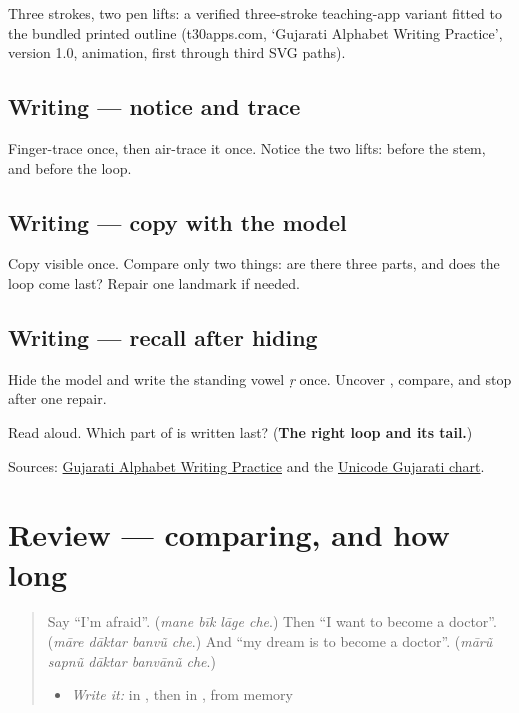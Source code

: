 Three strokes, two pen lifts: a verified three-stroke teaching-app variant fitted to the bundled printed outline (t30apps.com, ‘Gujarati Alphabet Writing Practice’, version 1.0,  animation, first through third SVG paths).

\subsection*{Writing — notice and trace}

Finger-trace \textbf{} once, then air-trace it once. Notice the two lifts: before the stem, and before the loop.

\subsection*{Writing — copy with the model}
Copy visible \textbf{} once. Compare only two things: are there three parts, and does the loop come last? Repair one landmark if needed.

\subsection*{Writing — recall after hiding}
Hide the model and write the standing vowel \emph{ṛ} once. Uncover \textbf{}, compare, and stop after one repair.

\begin{tcolorbox}[breakable,colback=teal!4,colframe=teal!35!black,title={Before you move on}]
Read \textbf{  } aloud. Which part of \textbf{} is written last? (\textbf{The right loop and its tail.})

Sources: \href{https://www.t30apps.com/gujarati-alphabet-writing/}{Gujarati Alphabet Writing Practice} and the \href{https://www.unicode.org/charts/PDF/U0A80.pdf}{Unicode Gujarati chart}.
\end{tcolorbox}
\section[(review)]{Review — comparing, and how long}

\label{lesson:GU-R282-comparing-and-time}



\begin{quote}
Say \textquotedblleft{}I'm afraid\textquotedblright{}. (\emph{mane bīk lāge che}.) Then \textquotedblleft{}I want to become a doctor\textquotedblright{}. (\emph{māre dāktar banvũ che}.) And \textquotedblleft{}my dream is to become a doctor\textquotedblright{}. (\emph{mārũ sapnũ dāktar banvānũ che}.)

\begin{itemize}
\raggedright
  \item \emph{Write it:} \textbf{} in \textbf{}, then \textbf{} in \textbf{}, from memory
\end{itemize}
\end{quote}

